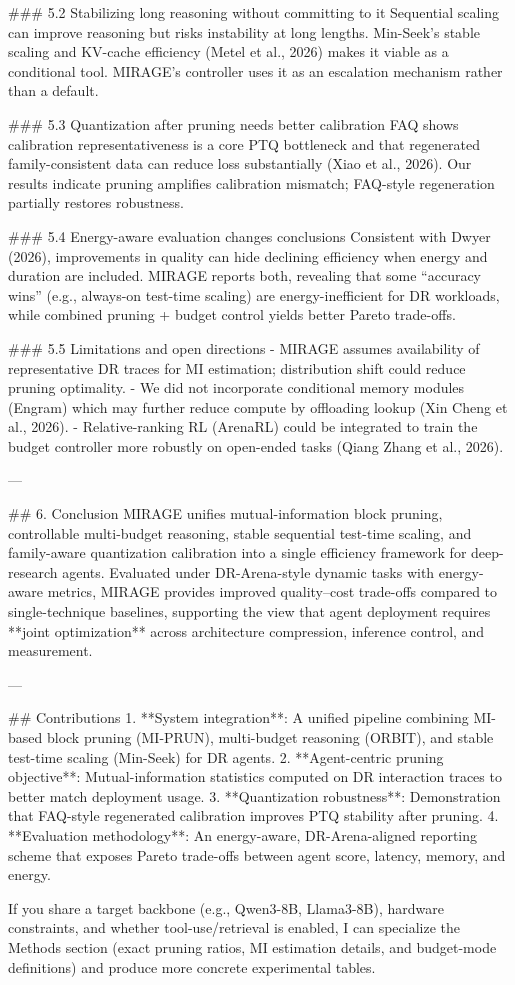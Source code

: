 ### 5.2 Stabilizing long reasoning without committing to it  
Sequential scaling can improve reasoning but risks instability at long lengths. Min-Seek’s stable scaling and KV-cache efficiency (Metel et al., 2026) makes it viable as a conditional tool. MIRAGE’s controller uses it as an escalation mechanism rather than a default.

### 5.3 Quantization after pruning needs better calibration  
FAQ shows calibration representativeness is a core PTQ bottleneck and that regenerated family-consistent data can reduce loss substantially (Xiao et al., 2026). Our results indicate pruning amplifies calibration mismatch; FAQ-style regeneration partially restores robustness.

### 5.4 Energy-aware evaluation changes conclusions  
Consistent with Dwyer (2026), improvements in quality can hide declining efficiency when energy and duration are included. MIRAGE reports both, revealing that some “accuracy wins” (e.g., always-on test-time scaling) are energy-inefficient for DR workloads, while combined pruning + budget control yields better Pareto trade-offs.

### 5.5 Limitations and open directions  
- MIRAGE assumes availability of representative DR traces for MI estimation; distribution shift could reduce pruning optimality.  
- We did not incorporate conditional memory modules (Engram) which may further reduce compute by offloading lookup (Xin Cheng et al., 2026).  
- Relative-ranking RL (ArenaRL) could be integrated to train the budget controller more robustly on open-ended tasks (Qiang Zhang et al., 2026).  

---

## 6. Conclusion  
MIRAGE unifies mutual-information block pruning, controllable multi-budget reasoning, stable sequential test-time scaling, and family-aware quantization calibration into a single efficiency framework for deep-research agents. Evaluated under DR-Arena-style dynamic tasks with energy-aware metrics, MIRAGE provides improved quality–cost trade-offs compared to single-technique baselines, supporting the view that agent deployment requires **joint optimization** across architecture compression, inference control, and measurement.

---

## Contributions  
1. **System integration**: A unified pipeline combining MI-based block pruning (MI-PRUN), multi-budget reasoning (ORBIT), and stable test-time scaling (Min-Seek) for DR agents.  
2. **Agent-centric pruning objective**: Mutual-information statistics computed on DR interaction traces to better match deployment usage.  
3. **Quantization robustness**: Demonstration that FAQ-style regenerated calibration improves PTQ stability after pruning.  
4. **Evaluation methodology**: An energy-aware, DR-Arena-aligned reporting scheme that exposes Pareto trade-offs between agent score, latency, memory, and energy.

If you share a target backbone (e.g., Qwen3-8B, Llama3-8B), hardware constraints, and whether tool-use/retrieval is enabled, I can specialize the Methods section (exact pruning ratios, MI estimation details, and budget-mode definitions) and produce more concrete experimental tables.